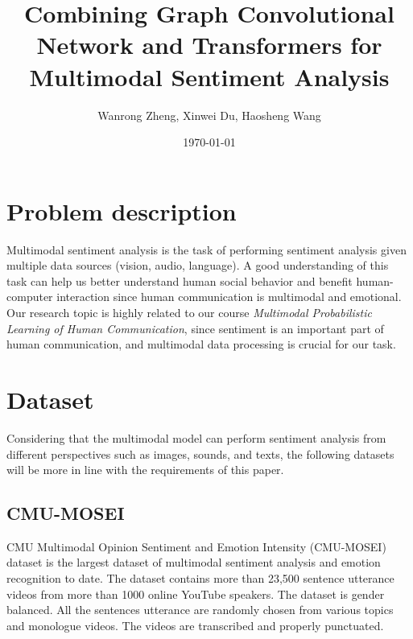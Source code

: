 \documentclass[11pt]{article}
\title{Combining Graph Convolutional Network and Transformers for Multimodal Sentiment Analysis}
\author{
  Wanrong Zheng,
  Xinwei Du,
  Haosheng Wang
  }
\date{\today}
\begin{document}
\maketitle

\section{Problem description}
Multimodal sentiment analysis is the task of performing sentiment analysis given multiple data sources (vision, audio, language).
A good understanding of this task can help us better understand human social behavior and benefit human-computer interaction since human communication is multimodal and emotional.
Our research topic is highly related to our course \textit{Multimodal Probabilistic Learning of Human Communication}, since sentiment is an important part of human communication, and multimodal data processing is crucial for our task.

\section{Dataset}

Considering that the multimodal model can perform sentiment analysis from different perspectives such as images, sounds, and texts, the following datasets will be more in line with the requirements of this paper.

\subsection{CMU-MOSEI}
CMU Multimodal Opinion Sentiment and Emotion Intensity (CMU-MOSEI) dataset is the largest dataset of multimodal sentiment analysis and emotion recognition to date. The dataset contains more than 23,500 sentence utterance videos from more than 1000 online YouTube speakers. The dataset is gender balanced. All the sentences utterance are randomly chosen from various topics and monologue videos. The videos are transcribed and properly punctuated.
\end{document}
